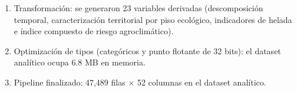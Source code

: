 \begin{enumerate}[leftmargin=*,itemsep=0.35em]
\item Transformación: se generaron 23 variables derivadas (descomposición temporal, caracterización territorial por piso ecológico, indicadores de helada e índice compuesto de riesgo agroclimático).
\item Optimización de tipos (categóricos y punto flotante de 32 bits): el dataset analítico ocupa 6.8 MB en memoria.
\item Pipeline finalizado: 47,489 filas \ensuremath{\times} 52 columnas en el dataset analítico.
\end{enumerate}